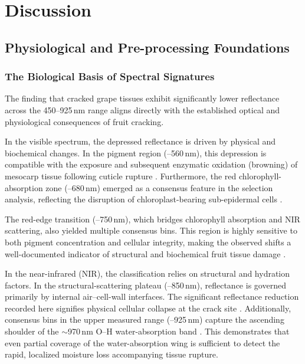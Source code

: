 \chapter{Discussion}
\label{chap:discussion}

\section{Physiological and Pre-processing Foundations}
\label{sec:physiology_preprocessing}

\subsection{The Biological Basis of Spectral Signatures}
\noindent
The finding that cracked grape tissues exhibit significantly lower reflectance across the 450--925\,nm range aligns directly with the established optical and physiological consequences of fruit cracking.

\medskip\noindent
In the visible spectrum, the depressed reflectance is driven by physical and biochemical changes. In the pigment region (--560\,nm), this depression is compatible with the exposure and subsequent enzymatic oxidation (browning) of mesocarp tissue following cuticle rupture \parencite{Wang2015FruitQualitySpectroscopy, Gitelson1994ChlorophyllReflectance, santos2023molecular, Moon2020EnzymaticBrowning}. Furthermore, the red chlorophyll-absorption zone (--680\,nm) emerged as a consensus feature in the selection analysis, reflecting the disruption of chloroplast-bearing sub-epidermal cells \parencite{Gitelson1994ChlorophyllReflectance}.

\medskip\noindent
The red-edge transition (--750\,nm), which bridges chlorophyll absorption and NIR scattering, also yielded multiple consensus bins. This region is highly sensitive to both pigment concentration and cellular integrity, making the observed shifts a well-documented indicator of structural and biochemical fruit tissue damage \parencite{Lu2020OpticalPropertiesReview, Imran2020RedEdgeNIRShoulder}.

\medskip\noindent
In the near-infrared (NIR), the classification relies on structural and hydration factors. In the structural-scattering plateau (--850\,nm), reflectance is governed primarily by internal air--cell-wall interfaces. The significant reflectance reduction recorded here signifies physical cellular collapse at the crack site \parencite{Lu2020OpticalPropertiesReview, Grimm2019CatastrophicFruitCracking, Chang2019, YU20251506}. Additionally, consensus bins in the upper measured range (--925\,nm) capture the ascending shoulder of the $\sim$970\,nm O--H water-absorption band \parencite{Cheng2019AppleDRS, Sun2021PeachBruisingOptical, Munera2021PersimmonDamageHSI}. This demonstrates that even partial coverage of the water-absorption wing is sufficient to detect the rapid, localized moisture loss accompanying tissue rupture.

